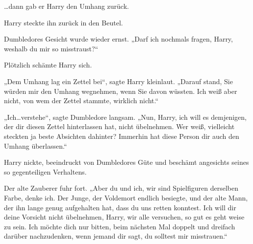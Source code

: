 …dann gab er Harry den Umhang zurück.

Harry steckte ihn zurück in den Beutel.

Dumbledores Gesicht wurde wieder ernst. „Darf ich nochmals fragen, Harry, weshalb du mir so misstraust?“

Plötzlich schämte Harry sich.

„Dem Umhang lag ein Zettel bei“, sagte Harry kleinlaut. „Darauf stand, Sie würden mir den Umhang wegnehmen, wenn Sie davon wüssten. Ich weiß aber nicht, von wem der Zettel stammte, wirklich nicht.“

„Ich…verstehe“, sagte Dumbledore langsam. „Nun, Harry, ich will es demjenigen, der dir diesen Zettel hinterlassen hat, nicht übelnehmen. Wer weiß, vielleicht steckten ja beste Absichten dahinter? Immerhin hat diese Person dir auch den Umhang überlassen.“

Harry nickte, beeindruckt von Dumbledores Güte und beschämt angesichts seines so gegenteiligen Verhaltens.

Der alte Zauberer fuhr fort. „Aber du und ich, wir sind Spielfiguren derselben Farbe, denke ich. Der Junge, der Voldemort endlich besiegte, und der alte Mann, der ihn lange genug aufgehalten hat, dass du uns retten konntest. Ich will dir deine Vorsicht nicht übelnehmen, Harry, wir alle versuchen, so gut es geht weise zu sein. Ich möchte dich nur bitten, beim nächsten Mal doppelt und dreifach darüber nachzudenken, wenn jemand dir sagt, du solltest mir misstrauen.“

